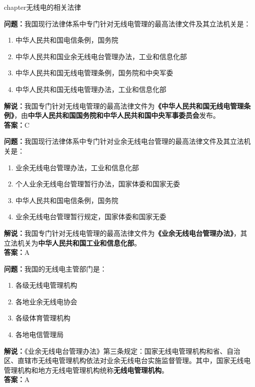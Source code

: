 chapter{无线电的相关法律}





\noindent\textbf{问题：}我国现行法律体系中专门针对无线电管理的最高法律文件及其立法机关是：
\begin{enumerate}[label=\Alph*), leftmargin=3em]
\item 中华人民共和国电信条例，国务院
\item 中华人民共和国业余无线电台管理办法，工业和信息化部
\item 中华人民共和国无线电管理条例，国务院和中央军委
\item 中华人民共和国无线电管理办法，工业和信息化部
\end{enumerate}
\noindent\textbf{解说：}我国专门针对无线电管理的最高法律文件为\textbf{《中华人民共和国无线电管理条例》}，由\textbf{中华人民共和国国务院和中华人民共和国中央军事委员会}发布。\\\noindent\textbf{答案：}C

\bigskip


\noindent\textbf{问题：}我国现行法律体系中专门针对业余无线电台管理的最高法律文件及其立法机关是：
\begin{enumerate}[label=\Alph*), leftmargin=3em]
\item 业余无线电台管理办法，工业和信息化部
\item 个人业余无线电台管理暂行办法，国家体委和国家无委
\item 中华人民共和国电信条例，国务院
\item 业余无线电台管理暂行规定，国家体委和国家无委
\end{enumerate}
\noindent\textbf{解说：}我国专门针对无线电管理的最高法律文件为\textbf{《业余无线电台管理办法》}，其立法机关为\textbf{中华人民共和国工业和信息化部}。\\\noindent\textbf{答案：}A

\bigskip


\noindent\textbf{问题：}我国的无线电主管部门是：
\begin{enumerate}[label=\Alph*), leftmargin=3em]
\item 各级无线电管理机构
\item 各地业余无线电协会
\item 各级体育管理机构
\item 各地电信管理局
\end{enumerate}
\noindent\textbf{解说：}《业余无线电台管理办法》第三条规定：国家无线电管理机构和省、自治区、直辖市无线电管理机构依法对业余无线电台实施监督管理。其中，国家无线电管理机构和地方无线电管理机构统称\textbf{无线电管理机构}。\\\noindent\textbf{答案：}A

